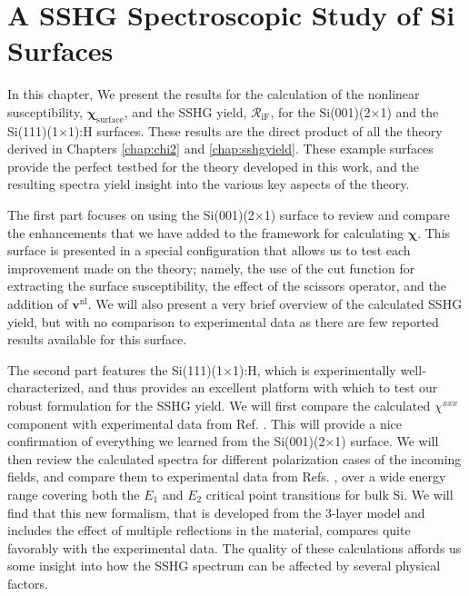 \chapter{A SSHG Spectroscopic Study of Si Surfaces}\label{chap:results}
\partialtoc

In this chapter, We present the results for the calculation of the nonlinear
susceptibility, $\boldsymbol{\chi}_{\mathrm{surface}}$, and the SSHG yield,
$\mathcal{R}_{\mathrm{iF}}$, for the Si(001)(2$\times$1) and the
Si(111)(1$\times$1):H surfaces. These results are the direct product of all the
theory derived in Chapters \ref{chap:chi2} and \ref{chap:sshgyield}. These
example surfaces provide the perfect testbed for the theory developed in this
work, and the resulting spectra yield insight into the various key aspects of
the theory.

The first part focuses on using the Si(001)(2$\times$1) surface to review and
compare the enhancements that we have added to the framework for calculating
$\boldsymbol{\chi}$. This surface is presented in a special configuration that
allows us to test each improvement made on the theory; namely, the use of the
cut function for extracting the surface susceptibility, the effect of the
scissors operator, and the addition of $\mathbf{v}^{\mathrm{nl}}$. We will also
present a very brief overview of the calculated SSHG yield, but with no
comparison to experimental data as there are few reported results available for
this surface.

The second part features the Si(111)(1$\times$1):H, which is experimentally
well-characterized, and thus provides an excellent platform with which to test
our robust formulation for the SSHG yield. We will first compare the calculated
$\chi^{xxx}$ component with experimental data from Ref. \cite{hoferAPA96}. This
will provide a nice confirmation of everything we learned from the
Si(001)(2$\times$1) surface. We will then review the calculated spectra for
different polarization cases of the incoming fields, and compare them to
experimental data from Refs. \cite{bergfeldPRL04, mejiaPRB02, mitchellSS01},
over a wide energy range covering both the $E_{1}$ and $E_{2}$ critical point
transitions for bulk Si. We will find that this new formalism, that is developed
from the 3-layer model and includes the effect of multiple reflections in the
material, compares quite favorably with the experimental data. The quality of
these calculations affords us some insight into how the SSHG spectrum can be
affected by several physical factors.



